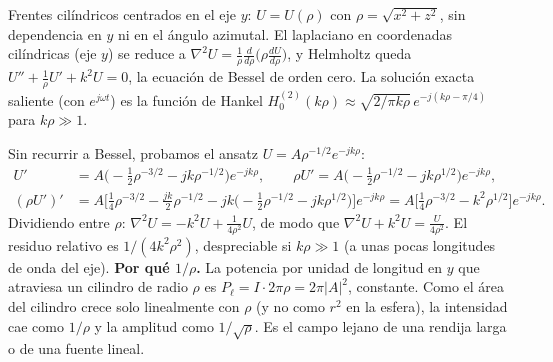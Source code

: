  Frentes cilíndricos centrados en el eje $y$: $U=U(\rho)$ con $\rho=\sqrt{x^2+z^2}$, sin dependencia en $y$ ni
en el ángulo azimutal. El laplaciano en coordenadas cilíndricas (eje $y$) se reduce a
$\nabla^2U=\frac1\rho\frac{d}{d\rho}\big(\rho\frac{dU}{d\rho}\big)$, y Helmholtz queda
$U''+\frac1\rho U'+k^2U=0$, la ecuación de Bessel de orden cero. La solución exacta saliente (con $e^{j\omega t}$) es
la función de Hankel $H_0^{(2)}(k\rho)\approx\sqrt{2/\pi k\rho}\,e^{-j(k\rho-\pi/4)}$ para $k\rho\gg1$.

Sin recurrir a Bessel, probamos el ansatz $U=A\rho^{-1/2}e^{-jk\rho}$:
\begin{align*}
U'&=A\Big(-\tfrac12\rho^{-3/2}-jk\rho^{-1/2}\Big)e^{-jk\rho},\qquad
\rho U'=A\Big(-\tfrac12\rho^{-1/2}-jk\rho^{1/2}\Big)e^{-jk\rho},\\
(\rho U')'&=A\Big[\tfrac14\rho^{-3/2}-\tfrac{jk}{2}\rho^{-1/2}-jk\Big(-\tfrac12\rho^{-1/2}-jk\rho^{1/2}\Big)\Big]e^{-jk\rho}
=A\Big[\tfrac14\rho^{-3/2}-k^2\rho^{1/2}\Big]e^{-jk\rho}.
\end{align*}
Dividiendo entre $\rho$: $\nabla^2U=-k^2U+\frac{1}{4\rho^2}U$, de modo que $\nabla^2U+k^2U=\frac{U}{4\rho^2}$. El residuo
relativo es $1/(4k^2\rho^2)$, despreciable si $k\rho\gg1$ (a unas pocas longitudes de onda del eje).
\textbf{Por qué $1/\rho$.} La potencia por unidad de longitud en $y$ que atraviesa un cilindro de radio $\rho$ es
$P_\ell=I\cdot2\pi\rho=2\pi|A|^2$, constante. Como el área del cilindro crece solo linealmente con $\rho$ (y no
como $r^2$ en la esfera), la intensidad cae como $1/\rho$ y la amplitud como $1/\sqrt\rho$. Es el campo lejano de
una rendija larga o de una fuente lineal.


\label{sol:6}

